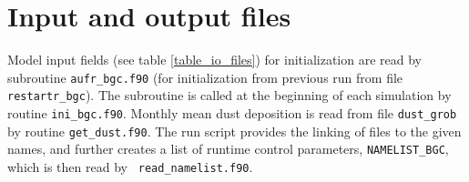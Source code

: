 \documentclass[11pt,a4paper,fleqn,twoside]{article}
\begin{document}
\clearpage
\newpage
\section{\label{io}Input and output files}

Model input fields (see table \ref{table_io_files}) for initialization are read
by subroutine
{\tt aufr\_bgc.f90} (for initialization from
previous run from file {\tt restartr\_bgc}). 
The subroutine is called at the beginning of
each simulation by routine {\tt ini\_bgc.f90}.  Monthly mean dust deposition is
read from file {\tt dust\_grob} by routine {\tt get\_dust.f90}. The run script
provides the linking of files to the given names, and further creates a list of
runtime control parameters, {\tt NAMELIST\_BGC}, which is then read by {\tt
read\_namelist.f90}.
\end{document}

